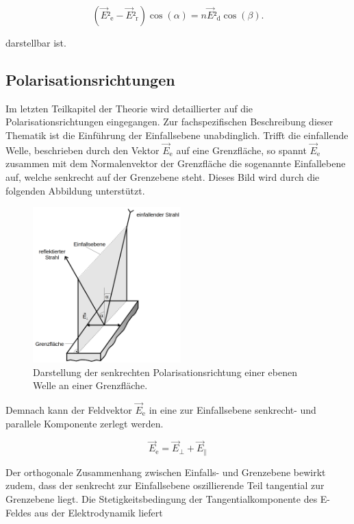 \begin{equation}
    \left(\vec{E}²_\text{e} - \vec{E}²_\text{r}\right)\cos(\alpha) = n\vec{E}²_\text{d}\cos(\beta).
\end{equation}

\noindent darstellbar ist. 

\subsection{Polarisationsrichtungen}
\label{sec:Polarisationsrichtungen}

Im letzten Teilkapitel der Theorie wird detaillierter auf die Polarisationsrichtungen eingegangen. Zur fachspezifischen Beschreibung dieser Thematik ist die Einführung der Einfallsebene 
unabdinglich. Trifft die einfallende Welle, beschrieben durch den Vektor $\vec{E}_\text{e}$ auf eine Grenzfläche, so spannt $\vec{E}_\text{e}$ zusammen mit dem Normalenvektor der Grenzfläche
die sogenannte Einfallebene auf, welche senkrecht auf der Grenzebene steht. Dieses Bild wird durch die folgenden Abbildung unterstützt.

\begin{figure}[H]
    \centering
    \includegraphics[height=6cm]{content/Einfallsebene.png}
    \caption{Darstellung der senkrechten Polarisationsrichtung einer ebenen Welle an einer Grenzfläche\cite{Versuchsanleitung_v407}.}
    \label{fig:SkizzePolarisationsrichtung}
\end{figure}

\noindent Demnach kann der Feldvektor $\vec{E}_\text{e}$ in eine zur Einfallsebene senkrecht- und parallele Komponente zerlegt werden.

\begin{equation*}
    \vec{E}_\text{e} = \vec{E}_\perp + \vec{E}_\parallel
\end{equation*}

\noindent Der orthogonale Zusammenhang zwischen Einfalls- und Grenzebene bewirkt zudem, dass der senkrecht zur Einfallsebene oszillierende Teil 
tangential zur Grenzebene liegt. Die Stetigkeitsbedingung der Tangentialkomponente des E-Feldes aus der Elektrodynamik liefert 

